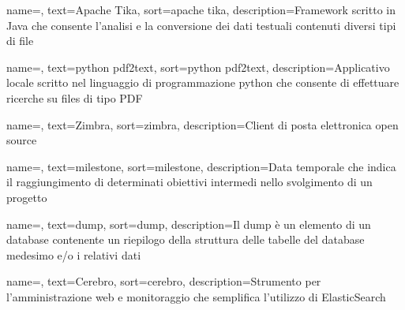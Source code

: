 {
	name=,
	text=Apache Tika,
	sort=apache tika,
	description={\gls{Framework} scritto in \gls{Java} che consente l'analisi e la conversione dei dati testuali contenuti diversi tipi di file}
}

{
	name=,
	text=python pdf2text,
	sort=python pdf2text,
	description={Applicativo locale scritto nel linguaggio di programmazione python che consente di effettuare ricerche su files di tipo PDF}
}

{
	name=,
	text=Zimbra,
	sort=zimbra,
	description={Client di posta elettronica \gls{open source}}
}

{
	name=,
	text=milestone,
	sort=milestone,
	description={Data temporale che indica il raggiungimento di determinati obiettivi intermedi nello svolgimento di un progetto}
}

{
	name=,
	text=dump,
	sort=dump,
	description={Il dump è un elemento di un database contenente un riepilogo della struttura delle tabelle del database medesimo e/o i relativi dati}
}

{
	name=,
	text=Cerebro,
	sort=cerebro,
	description={Strumento per l'amministrazione web e monitoraggio che semplifica l'utilizzo di \gls{ElasticSearch}}
}